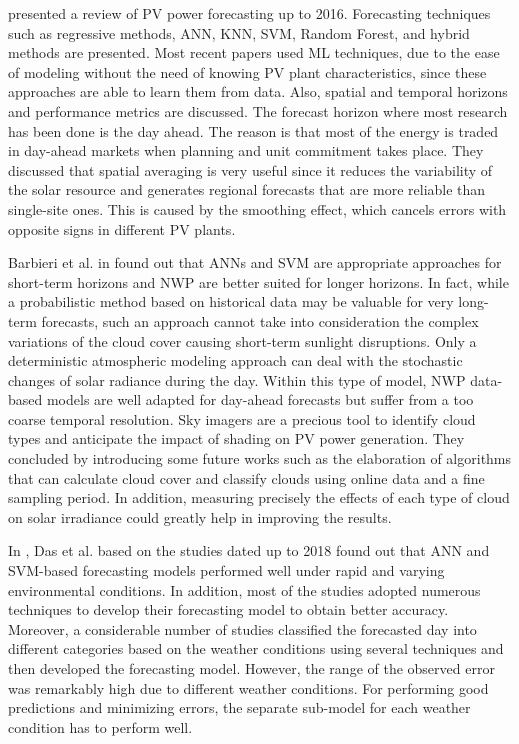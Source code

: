 \cite{ANTONANZAS201678} presented a review of PV power forecasting up to 2016.
Forecasting techniques such as regressive methods, ANN, KNN, SVM, Random Forest, and hybrid methods are presented.
Most recent papers used ML techniques, due to the ease of modeling without the need of knowing PV plant characteristics, since these approaches are able to learn them from data.
Also, spatial and temporal horizons and performance metrics are discussed.
The forecast horizon where most research has been done is the day ahead.
The reason is that most of the energy is traded in day-ahead markets when planning and unit commitment takes place.
They discussed that spatial averaging is very useful since it reduces the variability of the solar resource and generates regional forecasts that are more reliable than single-site ones.
This is caused by the smoothing effect, which cancels errors with opposite signs in different PV plants.

Barbieri et al. in \cite{BARBIERI2017242} found out that ANNs and SVM are appropriate approaches for short-term horizons and NWP are better suited for longer horizons.
In fact, while a probabilistic method based on historical data may be valuable for very long-term forecasts, such an approach cannot take into consideration the complex variations of the cloud cover causing short-term sunlight disruptions.
Only a deterministic atmospheric modeling approach can deal with the stochastic changes of solar radiance during the day.
Within this type of model, NWP data-based models are well adapted for day-ahead forecasts but suffer from a too coarse temporal resolution.
Sky imagers are a precious tool to identify cloud types and anticipate the impact of shading on PV power generation.
They concluded by introducing some future works such as the elaboration of algorithms that can calculate cloud cover and classify clouds using online data and a fine sampling period.
In addition, measuring precisely the effects of each type of cloud on solar irradiance could greatly help in improving the results.

In \cite{DAS2018912}, Das et al. based on the studies dated up to 2018 found out that ANN and SVM-based forecasting models performed well under rapid and varying environmental conditions.
In addition, most of the studies adopted numerous techniques to develop their forecasting model to obtain better accuracy.
Moreover, a considerable number of studies classified the forecasted day into different categories based on the weather conditions using several techniques and then developed the forecasting model.
However, the range of the observed error was remarkably high due to different weather conditions.
For performing good predictions and minimizing errors, the separate sub-model for each weather condition has to perform well.

